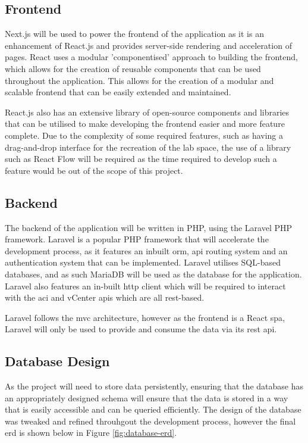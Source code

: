 \subsection{Frontend}
\label{design:web-application:frontend}
Next.js will be used to power the frontend of the application as it is an enhancement of React.js and provides server-side rendering and acceleration of pages. React uses a modular 'componentised' approach to building the frontend, which allows for the creation of reusable components that can be used throughout the application. This allows for the creation of a modular and scalable frontend that can be easily extended and maintained.

React.js also has an extensive library of open-source components and libraries that can be utilised to make developing the frontend easier and more feature complete. Due to the complexity of some required features, such as having a drag-and-drop interface for the recreation of the lab space, the use of a library such as React Flow will be required as the time required to develop such a feature would be out of the scope of this project.

\subsection{Backend}
\label{design:web-application:backend}
The backend of the application will be written in PHP, using the Laravel PHP framework. Laravel is a popular PHP framework that will accelerate the development process, as it features an inbuilt \gls{orm}, \gls{api} routing system and an authentication system that can be implemented. Laravel utilises SQL-based databases, and as such MariaDB will be used as the database for the application. Laravel also features an in-built \gls{http} client which will be required to interact with the \gls{aci} and vCenter \gls{api}s which are all \gls{rest}-based.

Laravel follows the \gls{mvc} architecture, however as the frontend is a React \gls{spa}, Laravel will only be used to provide and consume the data via its \gls{rest} \gls{api}.


\subsection{Database Design}
\label{design:web-application:database}
As the project will need to store data persistently, ensuring that the database has an appropriately designed schema will ensure that the data is stored in a way that is easily accessible and can be queried efficiently. The design of the database was tweaked and refined throuhgout the development process, however the final \gls{erd} is shown below in Figure \ref{fig:database-erd}.

